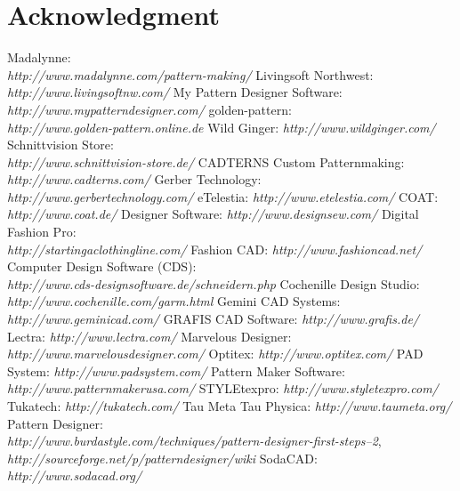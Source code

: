 \documentclass[10pt,letterpaper]{ltugboat}
\begin{document}

\section*{Acknowledgment}

\begin{thebibliography}{99}
 Madalynne:\\ \textit{http://www.madalynne.com/pattern-making/}
 Livingsoft Northwest:\\ \textit{http://www.livingsoftnw.com/}
 My Pattern Designer Software:\\ \textit{http://www.mypatterndesigner.com/‎}
 golden-pattern:\\ \textit{http://www.golden-pattern.online.de}
 Wild Ginger: \textit{http://www.wildginger.com/}
 Schnittvision Store:\\ \textit{http://www.schnittvision-store.de/}
 CADTERNS Custom Patternmaking:\\ \textit{http://www.cadterns.com/}
 Gerber Technology:\\ \textit{http://www.gerbertechnology.com/}
 eTelestia: \textit{http://www.etelestia.com/}
 COAT: \textit{http://www.coat.de/}
 Designer Software: \textit{http://www.designsew.com/}
 Digital Fashion Pro:\\ \textit{http://startingaclothingline.com/}
 Fashion CAD: \textit{http://www.fashioncad.net/}
 Computer Design Software (CDS):\\ \textit{http://www.cds-designsoftware.de/schneidern.php}
 Cochenille Design Studio:\\ \textit{http://www.cochenille.com/garm.html}
 Gemini CAD Systems:\\ \textit{http://www.geminicad.com/}
 GRAFIS CAD Software: \textit{http://www.grafis.de/}
 Lectra: \textit{http://www.lectra.com/}
 Marvelous Designer:\\ \textit{http://www.marvelousdesigner.com/}
 Optitex: \textit{http://www.optitex.com/}
 PAD System: \textit{http://www.padsystem.com/}
 Pattern Maker Software:\\ \textit{http://www.patternmakerusa.com/}
 STYLEtexpro: \textit{http://www.styletexpro.com/}
 Tukatech: \textit{http://tukatech.com/}
 Tau Meta Tau Physica: \textit{http://www.taumeta.org/}
 Pattern Designer:\\ \textit{http://www.burdastyle.com/techniques/pattern-designer-first-steps--2},\\
\textit{http://sourceforge.net/p/patterndesigner/wiki}
 SodaCAD: \textit{http://www.sodacad.org/}
\end{thebibliography}
\end{document}
